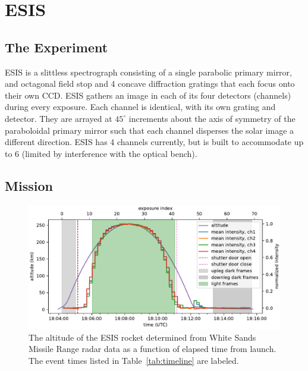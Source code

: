 \section{ESIS}

    
	\subsection{The Experiment}
	  	ESIS is a slittless spectrograph consisting of a single parabolic primary mirror, and octagonal field stop and 4 concave diffraction gratings that each focus onto their own CCD.
		ESIS gathers an image in each of its four detectors (channels) during every exposure.  
		Each channel is identical, with its own grating and detector. 
		They are arrayed at $45^{\circ}$ increments about the axis of symmetry of the paraboloidal primary mirror such that each channel disperses the solar image a different direction. ESIS has 4 channels currently, but is built to accommodate up to 6 (limited by interference with the optical bench).
		

    
	\subsection{Mission} 




		\begin{figure}[ht]
			\begin{center}
				\includegraphics{figures/signal_and_altitude_vs_time}
				\caption{The altitude of the ESIS rocket determined from White Sands Missile Range radar data as a function of elapsed time from launch.  The event times listed in Table~\ref{tab:timeline} are labeled.}
				\label{fig:timeline}
			\end{center}
		\end{figure}


